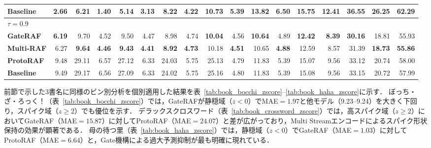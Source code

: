 \documentclass[twocolumn, lastpage]{jarticle}
\begin{document}
\begin{table}[t]
{\begin{tabular}{lrrrrrrrrrrrrrrrr}
        \quad \textbf{Baseline} & 2.66 & 6.21 & 1.40 & 5.14 & 3.13 & 8.22 & 4.22 & 10.73 & 5.39 & 13.82 & 6.50 & 15.75 & 12.41 & 36.55 & 26.25 & 62.29 \\
        \hline
        \multicolumn{17}{l}{$\tau=0.9$} \\
        \quad \textbf{GateRAF} & \textbf{6.19} & 9.70 & 4.52 & 9.50 & 4.47 & 8.98 & 4.74 & \textbf{10.04} & 4.56 & \textbf{10.64} & 4.89 & \textbf{12.42} & \textbf{8.39} & \textbf{30.16} & 18.81 & 55.93 \\
        \quad \textbf{Multi-RAF} & 6.27 & \textbf{9.64} & \textbf{4.46} & \textbf{9.43} & \textbf{4.41} & \textbf{8.92} & \textbf{4.73} & 10.18 & \textbf{4.51} & 10.65 & \textbf{4.88} & 12.59 & 8.57 & 31.39 & \textbf{18.73} & \textbf{55.86} \\
        \quad \textbf{ProtoRAF} & 9.48 & 29.11 & 6.57 & 27.12 & 6.33 & 24.03 & 5.75 & 25.13 & 4.79 & 11.83 & 5.39 & 15.07 & 9.56 & 33.12 & 20.74 & 58.00 \\
        \quad \textbf{Baseline} & 9.49 & 29.17 & 6.56 & 27.09 & 6.33 & 24.02 & 5.75 & 25.16 & 4.80 & 11.83 & 5.39 & 15.08 & 9.56 & 33.15 & 20.72 & 57.99 \\
        \hline
        \end{tabular}%
        }
    \end{table}
前節で示した3書名に同様のビン別分析を個別適用した結果を表~\ref{tab:book_bocchi_zscore}--\ref{tab:book_haha_zscore}に示す．
ぼっち・ざ・ろっく！（表~\ref{tab:book_bocchi_zscore}）では，GateRAFが静穏域（$z<0$）でMAE$=1.97$と他モデル（9.23--9.24）を大きく下回り，スパイク域（$z\geq2$）でも優位を示す．
デラックスクロスワード（表~\ref{tab:book_crossword_zscore}）では，高スパイク域（$z\geq2$）においてGateRAF（MAE$=15.87$）に対してProtoRAF（MAE$=24.07$）と差が広がっており，Multi Streamエンコードによるスパイク形状保持の効果が顕著である．
母の待つ里（表~\ref{tab:book_haha_zscore}）では，静穏域（$z<0$）でGateRAF（MAE$=1.03$）に対してProtoRAF（MAE$=6.64$）と，Gate機構による過大予測抑制が最も明確に現れている．
\end{document}
